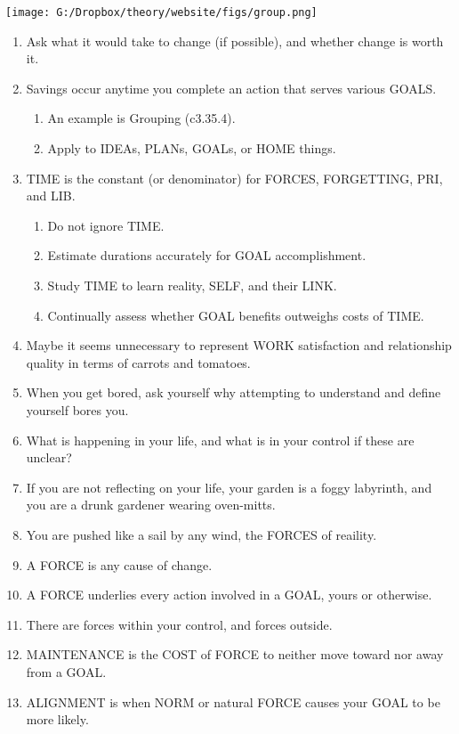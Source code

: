 \documentclass[
]{book}
\providecommand{\tightlist}{%
  \setlength{\itemsep}{0pt}\setlength{\parskip}{0pt}}
\begin{document}
\texttt{[image: G:/Dropbox/theory/website/figs/group.png]}

\begin{enumerate}
\def\labelenumi{\arabic{enumi}.}
\setcounter{enumi}{35}
\item
  Ask what it would take to change (if possible), and whether change is worth it.
\item
  Savings occur anytime you complete an action that serves various GOALS.

  \begin{enumerate}
  \def\labelenumii{\arabic{enumii}.}
  \tightlist
  \item
    An example is Grouping (c3.35.4).\\
  \item
    Apply to IDEAs, PLANs, GOALs, or HOME things.
  \end{enumerate}
\item
  TIME is the constant (or denominator) for FORCES, FORGETTING, PRI, and LIB.

  \begin{enumerate}
  \def\labelenumii{\arabic{enumii}.}
  \tightlist
  \item
    Do not ignore TIME.
  \item
    Estimate durations accurately for GOAL accomplishment.
  \item
    Study TIME to learn reality, SELF, and their LINK.
  \item
    Continually assess whether GOAL benefits outweighs costs of TIME.
  \end{enumerate}
\item
  Maybe it seems unnecessary to represent WORK satisfaction and relationship
  quality in terms of carrots and tomatoes.
\item
  When you get bored, ask yourself why attempting to understand and define yourself bores you.
\item
  What is happening in your life, and what is in your control if these are unclear?
\item
  If you are not reflecting on your life, your garden is a foggy labyrinth, and you are a drunk gardener wearing oven-mitts.
\item
  You are pushed like a sail by any wind, the FORCES of reaility.
\item
  A FORCE is any cause of change.
\item
  A FORCE underlies every action involved in a GOAL, yours or otherwise.
\item
  There are forces within your control, and forces outside.
\item
  MAINTENANCE is the COST of FORCE to neither move toward nor
  away from a GOAL.
\item
  ALIGNMENT is when NORM or natural FORCE causes your GOAL to be more likely.


\end{enumerate}
\end{document}
